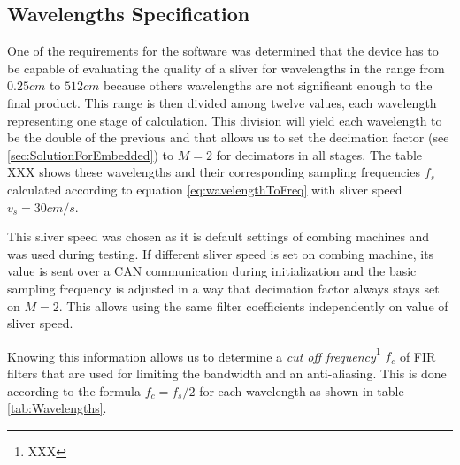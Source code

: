\documentclass[twoside]{ctuthesis}
\theoremstyle{plain}
\theoremstyle{definition}
\theoremstyle{note}
\begin{document}
\subsection{Wavelengths Specification}
\label{sec:WavelengthSpecification}
One of the requirements for the software was determined that the device has to be capable of evaluating the quality of a sliver for wavelengths in the range from $0.25 cm$ to $512 cm$ because others wavelengths are not significant enough to the final product. This range is then divided among twelve values, each wavelength representing one stage of calculation. This division will yield each wavelength to be the double of the previous and that allows us to set the decimation factor (see \ref{sec:SolutionForEmbedded}) to $M=2$ for decimators in all stages. The table XXX shows these wavelengths and their corresponding sampling frequencies $f_s$ calculated according to equation \ref{eq:wavelengthToFreq} with sliver speed $v_{s}=30 cm/s$. 

This sliver speed was chosen as it is default settings of combing machines and was used during testing. If different sliver speed is set on combing machine, its value is sent over a CAN communication during initialization and the basic sampling frequency is adjusted in a way that decimation factor always stays set on $M=2$. This allows using the same filter coefficients independently on value of sliver speed.

Knowing this information allows us to determine a \textit{cut off frequency}\footnote{XXX} $f_c$ of FIR filters that are used for limiting the bandwidth and an anti-aliasing. This is done according to the formula $f_c=f_s/2$ for each wavelength as shown in table \ref{tab:Wavelengths}.
\end{document}

